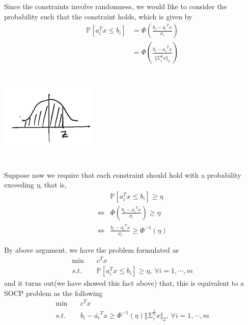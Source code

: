 Since the constraints involve randomness, we would like to consider the probability such that the constraint holds, which is given by
\begin{align*}
\mathbb{P}[a^T_i x\leq b_i]
&= \Phi\left(\frac{b_i - \bar{a_i}^Tx}{\sigma_i}\right)\\
&= \Phi\left(\frac{b_i - \bar{a_i}^Tx}{\Vert \Sigma_i^{\frac{1}{2}} x\Vert_2}\right)
\end{align*}

\begin{marginfigure}
\centering
\includegraphics[width=1.8in,height=1.8in]{figures/ch09/figure1118_2.png}
\end{marginfigure}

Suppose now we require that each constraint should hold with a probability exceeding $\eta$, that is,
\begin{align*}
& \mathbb{P}[a_i^Tx\leq b_i]\geq \eta\\
\Leftrightarrow&\Phi(\frac{b_i - \bar{a_i}^Tx}{\sigma_i})\geq \eta\\
\Leftrightarrow&\frac{b_i - \bar{a_i}^Tx}{\sigma_i}\geq \Phi^{-1}(\eta)
\end{align*}

By above argument, we have the problem formulated as 
\begin{align*}
\min \quad& c^Tx \\
s.t. \quad& \mathbb{P}[a_i^Tx\leq b_i]\geq \eta,\ \forall i = 1,\cdots,m
\end{align*}
and it turns out(we have showed this fact above) that, this is equivalent to a SOCP problem as the following
\begin{align*}
\min \quad& c^Tx \\
s.t. \quad& b_i - \bar{a_i}^Tx\geq \Phi^{-1}(\eta)\Vert\Sigma_i^{\frac{1}{2}}x\Vert_2,\ \forall i = 1,\cdots,m
\end{align*}




\vspace{0.5cm}
